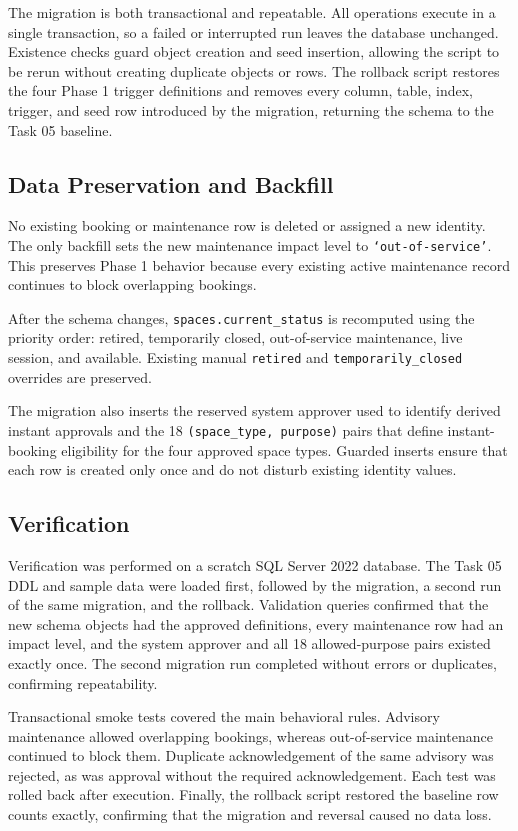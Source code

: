 The migration is both transactional and repeatable. All operations execute in
a single transaction, so a failed or interrupted run leaves the database
unchanged. Existence checks guard object creation and seed insertion, allowing
the script to be rerun without creating duplicate objects or rows. The rollback
script restores the four Phase 1 trigger definitions and removes every column,
table, index, trigger, and seed row introduced by the migration, returning the
schema to the Task 05 baseline.

\subsection{Data Preservation and Backfill}

No existing booking or maintenance row is deleted or assigned a new identity.
The only backfill sets the new maintenance impact level to
\texttt{`out-of-service'}. This preserves Phase 1 behavior because every
existing active maintenance record continues to block overlapping bookings.

After the schema changes, \texttt{spaces.current\_status} is recomputed using
the priority order: retired, temporarily closed, out-of-service maintenance,
live session, and available. Existing manual \texttt{retired} and
\texttt{temporarily\_closed} overrides are preserved.

The migration also inserts the reserved system approver used to identify
derived instant approvals and the 18 \texttt{(space\_type, purpose)} pairs that
define instant-booking eligibility for the four approved space types. Guarded
inserts ensure that each row is created only once and do not disturb existing
identity values.

\subsection{Verification}

Verification was performed on a scratch SQL Server 2022 database. The Task 05
DDL and sample data were loaded first, followed by the migration, a second run
of the same migration, and the rollback. Validation queries confirmed that the
new schema objects had the approved definitions, every maintenance row had an
impact level, and the system approver and all 18 allowed-purpose pairs existed
exactly once. The second migration run completed without errors or duplicates,
confirming repeatability.

Transactional smoke tests covered the main behavioral rules. Advisory
maintenance allowed overlapping bookings, whereas out-of-service maintenance
continued to block them. Duplicate acknowledgement of the same advisory was
rejected, as was approval without the required acknowledgement. Each test was
rolled back after execution. Finally, the rollback script restored the
baseline row counts exactly, confirming that the migration and reversal caused
no data loss.